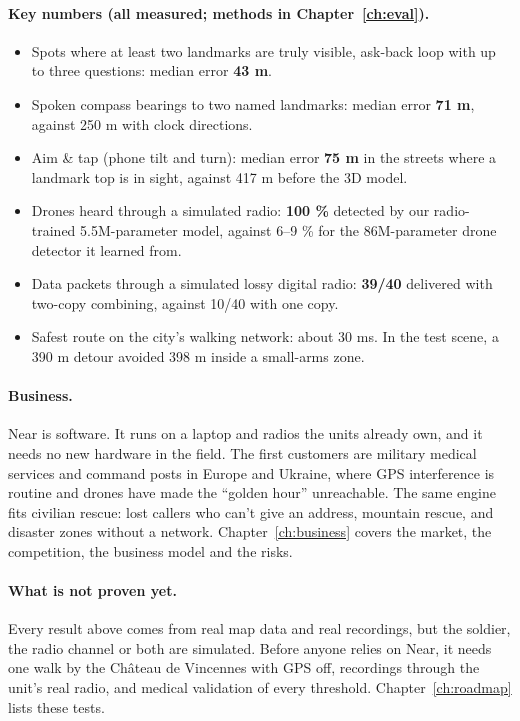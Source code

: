 \paragraph{Key numbers (all measured; methods in Chapter~\ref{ch:eval}).}
\begin{itemize}
  \item Spots where at least two landmarks are truly visible, ask-back loop with up to three
        questions: median error \textbf{43 m}.
  \item Spoken compass bearings to two named landmarks: median error \textbf{71 m}, against
        250 m with clock directions.
  \item Aim \& tap (phone tilt and turn): median error \textbf{75 m} in the streets where a landmark
        top is in sight, against 417 m before the 3D model.
  \item Drones heard through a simulated radio: \textbf{100 \%} detected by our radio-trained
        5.5M-parameter model, against 6--9 \% for the 86M-parameter drone detector it learned from.
  \item Data packets through a simulated lossy digital radio: \textbf{39/40} delivered with
        two-copy combining, against 10/40 with one copy.
  \item Safest route on the city's walking network: about 30 ms. In the test scene, a 390 m detour
        avoided 398 m inside a small-arms zone.
\end{itemize}

\paragraph{Business.} Near is software. It runs on a laptop and radios the units already own, and
it needs no new hardware in the field. The first customers are military medical services and
command posts in Europe and Ukraine, where GPS interference is routine and drones have made the
``golden hour'' unreachable. The same engine fits civilian rescue: lost callers who can't give
an address, mountain rescue, and disaster zones without a network. Chapter~\ref{ch:business}
covers the market, the competition, the business model and the risks.

\paragraph{What is not proven yet.} Every result above comes from real map data and real recordings, but the soldier,
the radio channel or both are simulated. Before anyone relies on Near, it needs one walk by the
Château de Vincennes with GPS off, recordings through the unit's real radio, and medical
validation of every threshold. Chapter~\ref{ch:roadmap} lists these tests.
